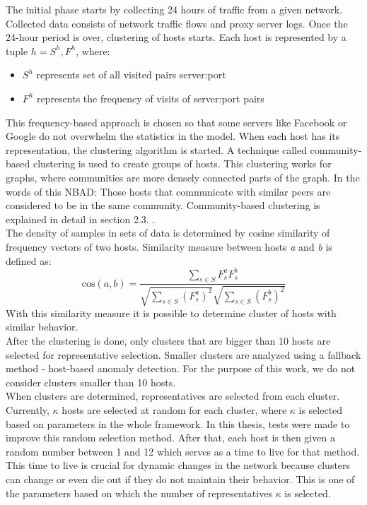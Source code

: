 \documentclass[thesis=B,english]{FITthesis}[2012/10/20]
\begin{document}
The initial phase starts by collecting 24 hours of traffic from a given network.
Collected data consists of network traffic flows and proxy server logs.
Once the 24-hour period is over, clustering of hosts starts.
Each host is represented by a tuple $h = {S^h, F^h}$, where:
\begin{itemize}
    \item $S^h$ represents set of all visited pairs server:port
    \item $F^h$ represents the frequency of visits of server:port pairs
\end{itemize}
This frequency-based approach is chosen so that some servers like Facebook or Google do not overwhelm the statistics in the model.
When each host has its representation, the clustering algorithm is started.
A technique called community-based clustering is used to create groups of hosts.
This clustering works for graphs, where communities are more densely connected parts of the graph.
In the words of this NBAD: Those hosts that communicate with similar peers are considered to be in the same community.
Community-based clustering is explained in detail in section 2.3. . \\

The density of samples in sets of data is determined by cosine similarity of frequency vectors of two hosts.
Similarity measure between hosts \textit{a} and \textit{b} is defined as:
\[
\textrm{cos}(a, b) = \frac{\sum\limits_{s \in S} F_s^a F_s^b} {\sqrt{\sum\limits_{s \in S} (F_s^a)^2} \sqrt{\sum\limits_{s \in S} (F_s^b)^2}}
\]
With this similarity measure it is possible to determine cluster of hosts with similar behavior. \\

After the clustering is done, only clusters that are bigger than 10 hosts are selected for representative selection.
Smaller clusters are analyzed using a fallback method - host-based anomaly detection.
For the purpose of this work, we do not consider clusters smaller than 10 hosts. \\

When clusters are determined, representatives are selected from each cluster.
Currently, $\kappa$ hosts are selected at random for each cluster, where $\kappa$ is selected based on parameters in the whole framework.
In this thesis, tests were made to improve this random selection method.
After that, each host is then given a random number between 1 and 12 which serves as a time to live for that method.
This time to live is crucial for dynamic changes in the network because clusters can change or even die out if they do not maintain their behavior.
This is one of the parameters based on which the number of representatives $\kappa$ is selected. \\
\end{document}
